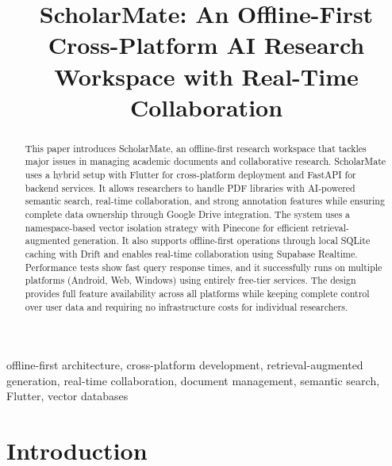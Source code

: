 \documentclass[conference]{IEEEtran}
\begin{document}
\title{ScholarMate: An Offline-First Cross-Platform AI Research Workspace with Real-Time Collaboration}

\author{
}

\maketitle

\begin{abstract}
This paper introduces ScholarMate, an offline-first research workspace that tackles major issues in managing academic documents and collaborative research. ScholarMate uses a hybrid setup with Flutter for cross-platform deployment and FastAPI for backend services. It allows researchers to handle PDF libraries with AI-powered semantic search, real-time collaboration, and strong annotation features while ensuring complete data ownership through Google Drive integration. The system uses a namespace-based vector isolation strategy with Pinecone for efficient retrieval-augmented generation. It also supports offline-first operations through local SQLite caching with Drift and enables real-time collaboration using Supabase Realtime. Performance tests show fast query response times, and it successfully runs on multiple platforms (Android, Web, Windows) using entirely free-tier services. The design provides full feature availability across all platforms while keeping complete control over user data and requiring no infrastructure costs for individual researchers.
\end{abstract}

\begin{IEEEkeywords}
offline-first architecture, cross-platform development, retrieval-augmented generation, real-time collaboration, document management, semantic search, Flutter, vector databases
\end{IEEEkeywords}

\section{Introduction}
\end{document}
